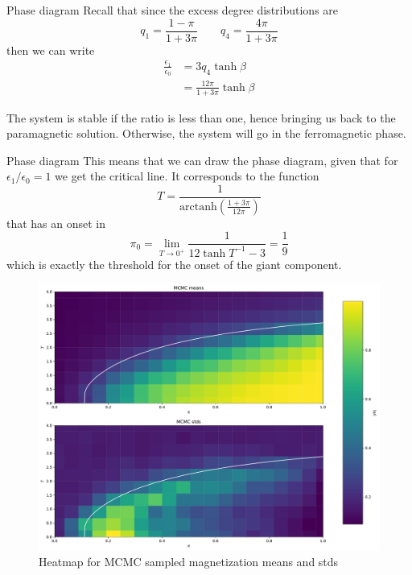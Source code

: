 \documentclass[handout]{beamer}
\newcommand{\arctanh}{\text{arctanh}}
\begin{document}
\begin{frame}{Phase diagram}
    Recall that since the excess degree distributions are
    $$
    q_1 = \frac{1-\pi}{1+3\pi} \qquad q_4 = \frac{4\pi}{1+3\pi}
    $$
    then we can write
    \begin{align}
        \frac{\epsilon_1}{\epsilon_0} &= 3q_4 \tanh{\beta}\\
                                      &= \frac{12\pi}{1+3\pi} \tanh{\beta}
    \end{align}

    The system is \alert{stable} if the ratio is less than one, hence bringing
    us back to the \alert{paramagnetic} solution. Otherwise, the system will go
    in the ferromagnetic phase.

\end{frame}

\begin{frame}{Phase diagram}
    This means that we can draw the phase diagram, given that for $\epsilon_1 /
    \epsilon_0 = 1$ we get the critical line. It corresponds to the function
    $$
        T = \frac{1}{\arctanh \left( \frac{1+3\pi}{12\pi} \right)}
    $$
    that has an onset in
    $$
        \pi_0 = \lim_{T\to 0^+} \frac{1}{12\tanh{T^{-1}}-3} = \frac{1}{9}
    $$
    which is exactly the threshold for the onset of the giant component.
\end{frame}

\begin{frame}[plain]
    \begin{figure}
        \centering
        \includegraphics[width=.8\textwidth]{mcmc_heatmap}
        \caption{Heatmap for MCMC sampled magnetization means and stds}
        \label{fig:mcmc_heatmap}
    \end{figure}
\end{frame}
\end{document}

